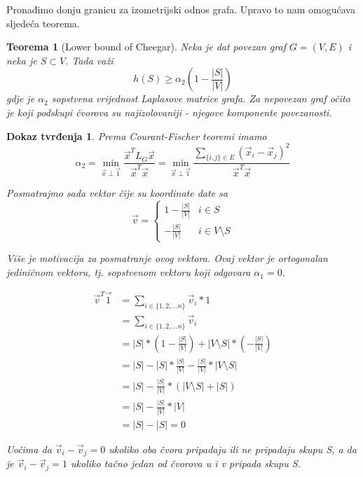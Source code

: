 \documentclass[11pt]{article}
\newtheorem{theorem}{Teorema}
\newtheorem*{custom_proof}{Dokaz tvrđenja}
\begin{document}
    Pronađimo donju granicu za izometrijski odnos grafa. Upravo to nam omogućava sljedeća teorema.

    \begin{theorem}[Lower bound of Cheegar]
        Neka je dat povezan graf $G=(V,E)$ i neka je $S \subset V$. Tada važi
        \[ h(S) \geq \alpha_2 (1 - \frac{|S|}{|V|})\]
        gdje je $\alpha_2$ sopstvena vrijednost Laplasove matrice grafa. Za nepovezan graf očito je koji podskupi čvorova su najizolovaniji - njegove komponente povezanosti.
    \end{theorem}

    \begin{custom_proof}
        Prema Courant-Fischer teoremi imamo
        \[
        \alpha_2 = \min_{\vec{x} \perp \vec{1}} \frac{\vec{x}^T L_G \vec{x}}{\vec{x}^T \vec{x}} 
        = \min_{\vec{x} \perp \vec{1}} \frac{ \sum_{\{i,j\} \in E} (\vec{x}_i - \vec{x}_j)^2}{\vec{x}^T \vec{x}}
        \]

        Posmatrajmo sada vektor čije su koordinate date sa
        \[
            \vec{v} = 
            \begin{cases}
                1 - \frac{|S|}{|V|} & i \in S\\ 
                - \frac{|S|}{|V|} & i \in V \setminus S
            \end{cases}
        \]

        Više je motivacija za posmatranje ovog vektora. Ovaj vektor je ortogonalan jediničnom vektoru, tj. sopstvenom vektoru koji odgovara $\alpha_1 = 0$.

        \[
        \begin{split}
            \vec{v}^T\vec{1} & = \sum_{i \in \{1,2, \dots n\}} \vec{v}_i * 1 \\
            & = \sum_{i \in \{1,2, \dots n\}} \vec{v}_i \\
            & = |S| * (  1 - \frac{|S|}{|V|} ) + |V \setminus S| * ( -\frac{|S|}{|V|})  \\
            & = |S| - |S| * \frac{|S|}{|V|} - \frac{|S|}{|V|} * |V \setminus S| \\
            & = |S| - \frac{|S|}{|V|} * (|V \setminus S| + |S|) \\
            & = |S| - \frac{|S|}{|V|} * |V| \\
            & = |S| - |S| = 0 
        \end{split}
        \]

        Uočima da $\vec{v}_i - \vec{v}_j = 0$ ukoliko oba čvora pripadaju ili ne pripadaju skupu S, 
		a da je $\vec{v}_i - \vec{v}_j = 1$ ukoliko tačno jedan od čvorova u i v pripada skupu S.
		

\end{custom_proof}
\end{document}
